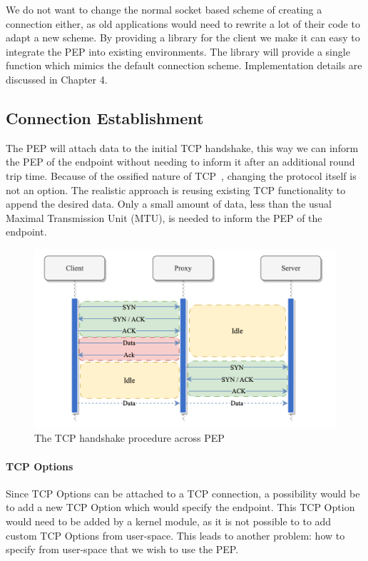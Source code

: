 \documentclass[a4paper,english, 12pt]{report}
\begin{document}
We do not want to change the normal socket based scheme of creating a connection either, as old applications would need to rewrite a lot of their code to adapt a new scheme. By providing a library for the client we make it can easy to integrate the PEP into existing environments. The library will provide a single function which mimics the default connection scheme. Implementation details are discussed in Chapter 4.

\subsection{Connection Establishment}  
The PEP will attach data to the initial TCP handshake, this way we can inform the PEP of the endpoint without needing to inform it after an additional round trip time. Because of the ossified nature of TCP~\cite{tcp_extendable}, changing the protocol itself is not an option. The realistic approach is reusing existing TCP functionality to append the desired data. Only a small amount of data, less than the usual Maximal Transmission Unit (MTU), is needed to inform the PEP of the endpoint. \\

\begin{figure} %
	\centering
	\includegraphics[scale=0.75]{../diagrams/drawio/tcphandshake_primitiv.png}
  	\caption{The TCP handshake procedure across PEP}
  	\label{fig:tcphandshake_primitiv}
\end{figure}

\paragraph{TCP Options}
Since TCP Options can be attached to a TCP connection, a possibility would be to add a new TCP Option which would specify the endpoint. This TCP Option would need to be added by a kernel module, as it is not possible to to add custom TCP Options from user-space. This leads to another problem: how to specify from user-space that we wish to use the PEP.\\
\end{document}
